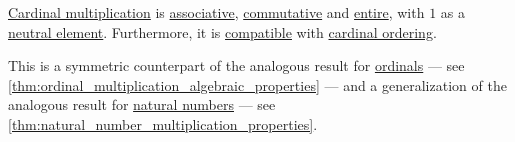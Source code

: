 \begin{proposition}\label{thm:cardinal_multiplication_algebraic_properties}
  \hyperref[def:cardinal_multiplication]{Cardinal multiplication} is \hyperref[def:binary_operation/associative]{associative}, \hyperref[def:binary_operation/associative]{commutative} and \hyperref[def:entire_semiring]{entire}, with \( 1 \) as a \hyperref[def:semigroup_neutral_element]{neutral element}. Furthermore, it is \hyperref[def:ordered_semigroup]{compatible} with \hyperref[def:cardinal_ordering]{cardinal ordering}.
\end{proposition}
\begin{comments}
  \item This is a symmetric counterpart of the analogous result for \hyperref[def:ordinal]{ordinals} --- see \cref{thm:ordinal_multiplication_algebraic_properties} --- and a generalization of the analogous result for \hyperref[def:natural_numbers]{natural numbers} --- see \cref{thm:natural_number_multiplication_properties}.
\end{comments}
